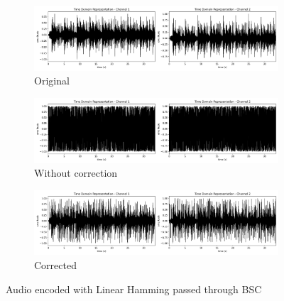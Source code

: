 \documentclass{article}
\begin{document}
\begin{figure}[htb]
    \centering
    \begin{subfigure}[b]{\textwidth}
        \centering
        \includegraphics[width=\textwidth]{../Result/wav-time-domain-TX.png}
        \caption{Original}
        \label{fig:t-audio-linear-bsc-original}
    \end{subfigure}
    \begin{subfigure}[b]{\textwidth}
        \centering
        \includegraphics[width=\textwidth]{../Result/linear-bsc-wav-time-domain-RX.png}
        \caption{Without correction}
        \label{fig:t-audio-linear-bsc-no-correction}
    \end{subfigure}
    \begin{subfigure}[b]{\textwidth}
        \centering
        \includegraphics[width=\textwidth]{../Result/linear-bsc-wav-time-domain-RX-syndrome-corrected.png}
        \caption{Corrected}
        \label{fig:t-audio-linear-bsc-syndrome-syndrome-corrected}
    \end{subfigure}
       \caption{Audio encoded with Linear Hamming passed through BSC}
       \label{fig:t-audio-linear-bsc}
\end{figure}
\end{document}
